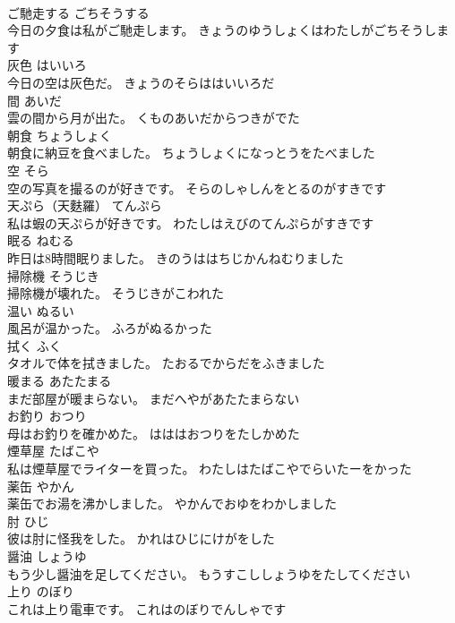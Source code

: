 \documentclass[8pt]{extreport}
\begin{document}
\begin{CJK}{UTF8}{min}
\\	ご馳走する	ごちそうする	
\\	今日の夕食は私がご馳走します。	きょうのゆうしょくはわたしがごちそうします	
\\	灰色	はいいろ	
\\	今日の空は灰色だ。	きょうのそらははいいろだ	
\\	間	あいだ	
\\	雲の間から月が出た。	くものあいだからつきがでた	
\\	朝食	ちょうしょく	
\\	朝食に納豆を食べました。	ちょうしょくになっとうをたべました	
\\	空	そら	
\\	空の写真を撮るのが好きです。	そらのしゃしんをとるのがすきです	
\\	天ぷら（天麩羅）	てんぷら	
\\	私は蝦の天ぷらが好きです。	わたしはえびのてんぷらがすきです	
\\	眠る	ねむる	
\\	昨日は8時間眠りました。	きのうははちじかんねむりました	
\\	掃除機	そうじき	
\\	掃除機が壊れた。	そうじきがこわれた	
\\	温い	ぬるい	
\\	風呂が温かった。	ふろがぬるかった	
\\	拭く	ふく	
\\	タオルで体を拭きました。	たおるでからだをふきました	
\\	暖まる	あたたまる	
\\	まだ部屋が暖まらない。	まだへやがあたたまらない	
\\	お釣り	おつり	
\\	母はお釣りを確かめた。	はははおつりをたしかめた	
\\	煙草屋	たばこや	
\\	私は煙草屋でライターを買った。	わたしはたばこやでらいたーをかった	
\\	薬缶	やかん	
\\	薬缶でお湯を沸かしました。	やかんでおゆをわかしました	
\\	肘	ひじ	
\\	彼は肘に怪我をした。	かれはひじにけがをした	
\\	醤油	しょうゆ	
\\	もう少し醤油を足してください。	もうすこししょうゆをたしてください	
\\	上り	のぼり	
\\	これは上り電車です。	これはのぼりでんしゃです	

\end{CJK}
\end{document}
